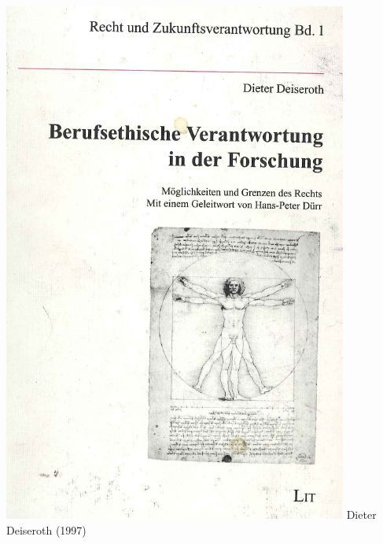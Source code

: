 \documentclass[presentation]{beamer}
\begin{document}
\begin{frame}
\begin{columns}[t]
\begin{column}{0.25\textwidth}
\includegraphics[width=\textwidth]{./deiseroth.png}
\newline
\tiny Dieter Deiseroth (1997)
\end{column}
\begin{column}{0.25\textwidth}
\label{sec-5-1-1-3}


\end{column}
\end{columns}
\end{frame}
\end{document}
